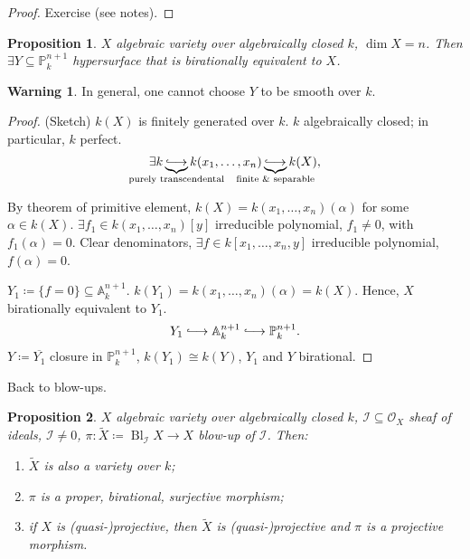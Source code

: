 \documentclass[12pt]{article}
\DeclareMathOperator{\Bl}{Bl}
\newtheorem*{proposition}{Proposition}
\theoremstyle{definition}
\newtheorem*{warning}{Warning}
\begin{document}
\begin{proof}
Exercise (see notes).
\end{proof}

\begin{proposition}
$X$ algebraic variety over algebraically closed $k$, $\dim X=n$. Then $\exists Y\subseteq\mathbb{P}_k^{n+1}$ hypersurface that is birationally equivalent to $X$.
\end{proposition}

\begin{warning}
In general, one cannot choose $Y$ to be smooth over $k$.
\end{warning}

\begin{proof}
(Sketch) $k(X)$ is finitely generated over $k$. $k$ algebraically closed; in particular, $k$ perfect.
\[\exists k\underbrace{\lhook\joinrel\longrightarrow}_{\mathclap{\text{purely transcendental}}}k(x_1,\ldots,x_n)\underbrace{\lhook\joinrel\longrightarrow}_{\mathclap{\text{finite \& separable}}}k(X),\]

By theorem of primitive element, $k(X)=k(x_1,\ldots,x_n)(\alpha)$ for some $\alpha\in k(X)$. $\exists f_1\in k(x_1,\ldots,x_n)[y]$ irreducible polynomial, $f_1\neq0$, with $f_1(\alpha)=0$. Clear denominators, $\exists f\in k[x_1,\ldots,x_n,y]$ irreducible polynomial, $f(\alpha)=0$.

$Y_1\coloneqq\{f=0\}\subseteq\mathbb{A}_k^{n+1}$. $k(Y_1)=k(x_1,\ldots,x_n)(\alpha)=k(X)$. Hence, $X$ birationally equivalent to $Y_1$.
\[Y_1\lhook\joinrel\longrightarrow\mathbb{A}_k^{n+1}\lhook\joinrel\longrightarrow\mathbb{P}_k^{n+1}.\]
$Y\coloneqq\overline{Y_1}$ closure in $\mathbb{P}_k^{n+1}$, $k(Y_1)\cong k(Y)$, $Y_1$ and $Y$ birational.
\end{proof}

Back to blow-ups.

\begin{proposition}
$X$ algebraic variety over algebraically closed $k$, $\mathcal{I}\subseteq\mathcal{O}_X$ sheaf of ideals, $\mathcal{I}\neq0$, $\pi:\widetilde{X}\coloneqq\Bl_{\mathcal{I}}X\rightarrow X$ blow-up of $\mathcal{I}$. Then:
\begin{enumerate}[label=\arabic*)]
\item $\widetilde{X}$ is also a variety over $k$;
\item $\pi$ is a proper, birational, surjective morphism;
\item if $X$ is (quasi-)projective, then $\widetilde{X}$ is (quasi-)projective and $\pi$ is a projective morphism.
\end{enumerate}
\end{proposition}
\end{document}
